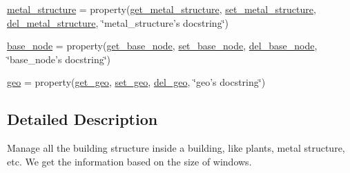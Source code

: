 \begin{DoxyCompactItemize}
\hyperlink{classstructure_1_1_building_structure_1_1_building_structure_a7e7ae4e752e5ab9e20c99fc2a6fdfa85}{metal\-\_\-structure} = property(\hyperlink{classstructure_1_1_building_structure_1_1_building_structure_aed50f895158aee8fdd0b85c6a1bd9755}{get\-\_\-metal\-\_\-structure}, \hyperlink{classstructure_1_1_building_structure_1_1_building_structure_a7b16f8682c0503d6f88382024928144a}{set\-\_\-metal\-\_\-structure}, \hyperlink{classstructure_1_1_building_structure_1_1_building_structure_a5edb5ee13240fd1300af6e6c13b128a8}{del\-\_\-metal\-\_\-structure}, \char`\"{}metal\-\_\-structure's docstring\char`\"{})
\item 
\hyperlink{classstructure_1_1_building_structure_1_1_building_structure_a18075785b5c4524f6731c1fda15c7730}{base\-\_\-node} = property(\hyperlink{classstructure_1_1_building_structure_1_1_building_structure_a2031c79559a3758c0163edc2f0c026d9}{get\-\_\-base\-\_\-node}, \hyperlink{classstructure_1_1_building_structure_1_1_building_structure_a5965a45f1c993fcd01703037bfb1da0b}{set\-\_\-base\-\_\-node}, \hyperlink{classstructure_1_1_building_structure_1_1_building_structure_a919e71c56172f51e9b5c68fb00ab537a}{del\-\_\-base\-\_\-node}, \char`\"{}base\-\_\-node's docstring\char`\"{})
\item 
\hyperlink{classstructure_1_1_building_structure_1_1_building_structure_aaab7e34d7840eabc316e706238e859e3}{geo} = property(\hyperlink{classstructure_1_1_building_structure_1_1_building_structure_acbe644c4c1d7888379d542af4fbfeb79}{get\-\_\-geo}, \hyperlink{classstructure_1_1_building_structure_1_1_building_structure_a5012995eb6702082f0ae5bdf2d300e0e}{set\-\_\-geo}, \hyperlink{classstructure_1_1_building_structure_1_1_building_structure_af765e311450bfc91ed62fb0fb0b9ddbf}{del\-\_\-geo}, \char`\"{}geo's docstring\char`\"{})
\end{DoxyCompactItemize}


\subsection{Detailed Description}
\begin{DoxyVerb}Manage all the building structure inside a building, like plants, metal structure, etc.
We get the information based on the size of windows.
\end{DoxyVerb}
 

